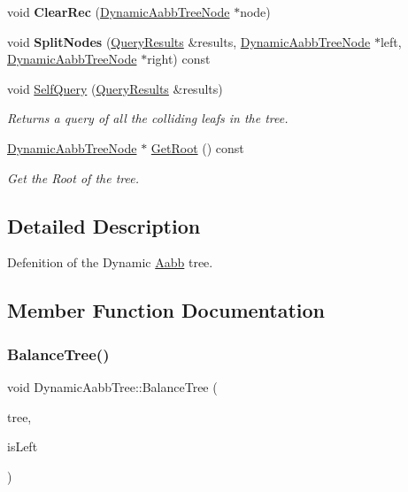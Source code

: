 \begin{DoxyCompactItemize}
void {\bfseries Clear\+Rec} (\hyperlink{classDynamicAabbTreeNode}{Dynamic\+Aabb\+Tree\+Node} $\ast$node)
\item 
\mbox{\label{classDynamicAabbTree_a414b8be117907a2663d3545f991893b4}} 
void {\bfseries Split\+Nodes} (\hyperlink{classQueryResults}{Query\+Results} \&results, \hyperlink{classDynamicAabbTreeNode}{Dynamic\+Aabb\+Tree\+Node} $\ast$left, \hyperlink{classDynamicAabbTreeNode}{Dynamic\+Aabb\+Tree\+Node} $\ast$right) const
\item 
void \hyperlink{classDynamicAabbTree_aeac77e79abc258f405a0a31e6bfe76e6}{Self\+Query} (\hyperlink{classQueryResults}{Query\+Results} \&results)
\begin{DoxyCompactList}\small\item\em Returns a query of all the colliding leafs in the tree. \end{DoxyCompactList}\item 
\hyperlink{classDynamicAabbTreeNode}{Dynamic\+Aabb\+Tree\+Node} $\ast$ \hyperlink{classDynamicAabbTree_ad0e823a4a4e9bef83b3fb8d846d078e0}{Get\+Root} () const
\begin{DoxyCompactList}\small\item\em Get the Root of the tree. \end{DoxyCompactList}\end{DoxyCompactItemize}


\subsection{Detailed Description}
Defenition of the Dynamic \hyperlink{classAabb}{Aabb} tree. 

\subsection{Member Function Documentation}
\mbox{\label{classDynamicAabbTree_a5b1ccfaeccdac45d57316b61eb9a49ac}} 
\subsubsection{\texorpdfstring{Balance\+Tree()}{BalanceTree()}}
{\footnotesize\ttfamily void Dynamic\+Aabb\+Tree\+::\+Balance\+Tree (\begin{DoxyParamCaption}\item[{\hyperlink{classDynamicAabbTreeNode}{Dynamic\+Aabb\+Tree\+Node} $\ast$}]{tree,  }\item[{bool}]{is\+Left }\end{DoxyParamCaption})}



